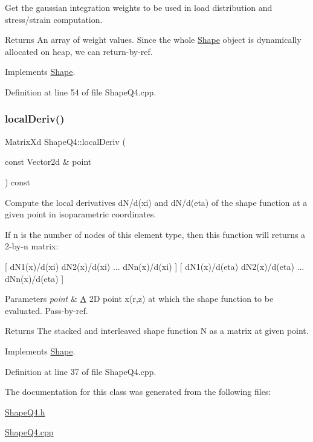 Get the gaussian integration weights to be used in load distribution and stress/strain computation. 

\begin{DoxyReturn}{Returns}
An array of weight values. Since the whole \mbox{\hyperlink{class_shape}{Shape}} object is dynamically allocated on heap, we can return-\/by-\/ref. 
\end{DoxyReturn}


Implements \mbox{\hyperlink{class_shape_a4257697bb443af2871a7cc7a82c8c823}{Shape}}.



Definition at line 54 of file Shape\+Q4.\+cpp.

\mbox{\label{class_shape_q4_ad3e1f5e25aee96cd21b1c8770c35afd0}} 
\subsubsection{\texorpdfstring{local\+Deriv()}{localDeriv()}}
{\footnotesize\ttfamily Matrix\+Xd Shape\+Q4\+::local\+Deriv (\begin{DoxyParamCaption}\item[{const Vector2d \&}]{point }\end{DoxyParamCaption}) const\hspace{0.3cm}{\ttfamily [virtual]}}



Compute the local derivatives d\+N/d(xi) and d\+N/d(eta) of the shape function at a given point in isoparametric coordinates. 

If n is the number of nodes of this element type, then this function will returns a 2-\/by-\/n matrix\+:

\mbox{[} d\+N1(x)/d(xi) d\+N2(x)/d(xi) ... d\+Nn(x)/d(xi) \mbox{]} \mbox{[} d\+N1(x)/d(eta) d\+N2(x)/d(eta) ... d\+Nn(x)/d(eta) \mbox{]}


\begin{DoxyParams}{Parameters}
{\em point} & \mbox{\hyperlink{class_a}{A}} 2D point x(r,z) at which the shape function to be evaluated. Pass-\/by-\/ref. \\
\hline
\end{DoxyParams}
\begin{DoxyReturn}{Returns}
The stacked and interleaved shape function N as a matrix at given point. 
\end{DoxyReturn}


Implements \mbox{\hyperlink{class_shape_a55575394f656e3ee4b5ac37ea04af8c9}{Shape}}.



Definition at line 37 of file Shape\+Q4.\+cpp.



The documentation for this class was generated from the following files\+:\begin{DoxyCompactItemize}
\item 
\mbox{\hyperlink{_shape_q4_8h}{Shape\+Q4.\+h}}\item 
\mbox{\hyperlink{_shape_q4_8cpp}{Shape\+Q4.\+cpp}}\end{DoxyCompactItemize}
